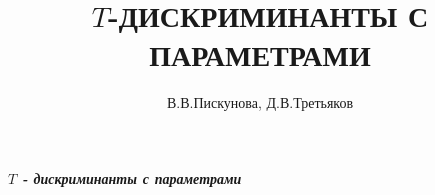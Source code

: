 


\label{Piskunova_V_V_Tret'jakov_D_V_begin}

{{\footnotesize {\it \textbf{{$T$} - дискриминанты с параметрами}}}}


\medskip
\normalsize

\label{Piskunova,Tretyakov_begin}

\title{$T$-ДИСКРИМИНАНТЫ С ПАРАМЕТРАМИ}

\author{В.\;В.\;Пискунова, Д.\;В.\;Третьяков}

\address{Крымский федеральный университет им.~В.\;И.\;Вернадского \\ Таврическая академия \\
факультет математики и информатики \\
просп. акад. Вернадского, 4, Симферополь, 295007, Российская Федерация \\
e-mail: \textit viktoryapiskunova@yandex.ru, dvttvd@mail.ru}


